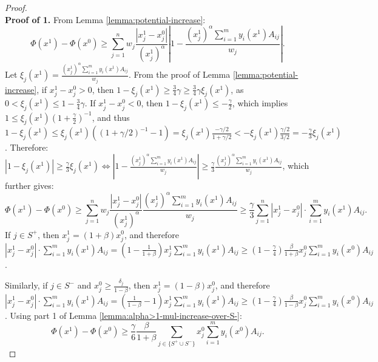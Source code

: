 \documentclass[11pt]{article}
\begin{document}
\begin{proof}
$\quad$\\
\noindent\textbf{Proof of 1.} From Lemma \ref{lemma:potential-increase}:
\begin{equation*}
\Phi(x^1) - \Phi(x^0) \geq \sum_{j=1}^n w_j \frac{|x_j^1 - x_j^0|}{(x_j^1)^{\alpha}}\left|1 - \frac{(x_j^1)^{\alpha}\sum_{i=1}^m y_i(x^1)A_{ij}}{w_j}\right|.
\end{equation*}
Let $\xi_j(x^1) = \frac{(x_j^1)^{\alpha}\sum_{i=1}^m y_i(x^1) A_{ij}}{w_j}$. 
From the proof of Lemma \ref{lemma:potential-increase}, if $x_j^1 - x_j^0 > 0$, then $1 - \xi_j(x^1)\geq \frac{3}{4}\gamma \geq \frac{3}{4}\gamma \xi_j(x^1)$, as $0 < \xi_j(x^1) \leq 1 - \frac{3}{4}\gamma$. If $x_j^ 1 - x_j^0 < 0$, then $1 - \xi_j(x^1) \leq - \frac{\gamma}{2}$, which implies $1\leq \xi_j(x^1)(1 +\frac{\gamma}{2})^{-1}$, and thus $1 - \xi_j(x^1) \leq \xi_j(x^1)((1 + \gamma/2)^{-1} - 1) = \xi_j(x^1) \frac{-\gamma/2}{1 + \gamma/2} <-\xi_j(x^1)\frac{\gamma/2}{3/2}= -\frac{\gamma}{3}\xi_j(x^1)$.
Therefore: $|1-\xi_j(x^1)|\geq \frac{\gamma}{3}\xi_j(x^1) \Leftrightarrow\left|1 - \frac{(x_j^1)^{\alpha}\sum_{i=1}^m y_i(x^1)A_{ij}}{w_j}\right|\geq \frac{\gamma}{3}\frac{(x_j^1)^{\alpha}\sum_{i=1}^m y_i(x^1)A_{ij}}{w_j}$, which further gives:
\begin{equation*}
\Phi(x^1) - \Phi(x^0) \geq \sum_{j=1}^n w_j \frac{|x_j^1 - x_j^0|}{(x_j^1)^{\alpha}} \frac{(x_j^1)^{\alpha}\sum_{i=1}^m y_i(x^1)A_{ij}}{w_j} \geq \frac{\gamma}{3}\sum_{j=1}^n |x_j^1 - x_j^0|\cdot \sum_{i=1}^m y_i(x^1)A_{ij}.
\end{equation*}
If $j\in S^+$, then $x_j^1 = (1+\beta)x_j^0$, and therefore $|x_j^1 - x_j^0|\cdot \sum_{i=1}^m y_i(x^1)A_{ij} = \left(1 - \frac{1}{1+\beta}\right)x_j^1\sum_{i=1}^m y_i(x^1)A_{ij}\geq \left(1 - \frac{\gamma}{4}\right)\frac{\beta}{1+\beta}x_j^0\sum_{i=1}^m y_i(x^0)A_{ij}$.

Similarly, if $j\in S^-$ and $x_j^0 \geq \frac{\delta_j}{1-\beta}$, then $x_j^1 = (1-\beta)x_j^0$, and therefore $|x_j^1 - x_j^0|\cdot \sum_{i=1}^m y_i(x^1)A_{ij} = \left(\frac{1}{1-\beta}-1\right)x_j^1\sum_{i=1}^m y_i(x^1)A_{ij}\geq \left(1 - \frac{\gamma}{4}\right)\frac{\beta}{1-\beta}x_j^0\sum_{i=1}^m y_i(x^0)A_{ij}$. Using part 1 of Lemma \ref{lemma:alpha>1-mul-increase-over-S-}:
\begin{equation*}
\Phi(x^1) - \Phi(x^0) \geq \frac{\gamma}{6}\frac{\beta}{1+\beta}\sum_{j\in \{S^+\cup S^-\}} x_j^0\sum_{i=1}^m y_i(x^0)A_{ij}.
\end{equation*}


\end{proof}
\end{document}
